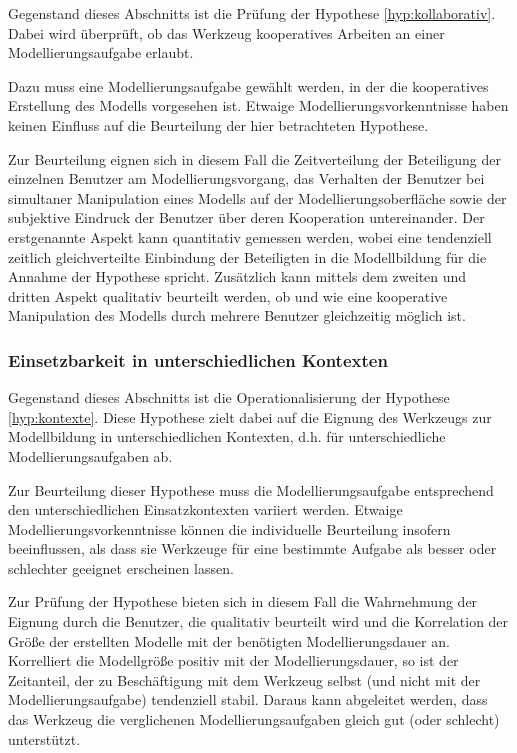 Gegenstand dieses Abschnitts ist die Prüfung der Hypothese \ref{hyp:kollaborativ}. Dabei wird überprüft, ob das Werkzeug kooperatives Arbeiten an einer Modellierungsaufgabe erlaubt.

Dazu muss eine Modellierungsaufgabe gewählt werden, in der die kooperatives Erstellung des Modells vorgesehen ist. Etwaige Modellierungsvorkenntnisse haben keinen Einfluss auf die Beurteilung der hier betrachteten Hypothese.

Zur Beurteilung eignen sich in diesem Fall die Zeitverteilung der Beteiligung der einzelnen Benutzer am Modellierungsvorgang, das Verhalten der Benutzer bei simultaner Manipulation eines Modells auf der Modellierungsoberfläche sowie der subjektive Eindruck der Benutzer über deren Kooperation untereinander. Der erstgenannte Aspekt kann quantitativ gemessen werden, wobei eine tendenziell zeitlich gleichverteilte Einbindung der Beteiligten in die Modellbildung für die Annahme der Hypothese spricht. Zusätzlich kann mittels dem zweiten und dritten Aspekt qualitativ beurteilt werden, ob und wie eine kooperative Manipulation des Modells durch mehrere Benutzer gleichzeitig möglich ist.


\subsubsection{Einsetzbarkeit in unterschiedlichen Kontexten} %
\label{ssub:einsetzbarkeit_in_unterschiedlichen_kontexten}

Gegenstand dieses Abschnitts ist die Operationalisierung der Hypothese \ref{hyp:kontexte}. Diese Hypothese zielt dabei auf die Eignung des Werkzeugs zur Modellbildung in unterschiedlichen Kontexten, d.h. für unterschiedliche Modellierungsaufgaben ab. 

Zur Beurteilung dieser Hypothese muss die Modellierungsaufgabe entsprechend den unterschiedlichen Einsatzkontexten variiert werden. Etwaige Modellierungsvorkenntnisse können die individuelle Beurteilung insofern beeinflussen, als dass sie Werkzeuge für eine bestimmte Aufgabe als besser oder schlechter geeignet erscheinen lassen.

Zur Prüfung der Hypothese bieten sich in diesem Fall die Wahrnehmung der Eignung durch die Benutzer, die qualitativ beurteilt wird und die Korrelation der Größe der erstellten Modelle mit der benötigten Modellierungsdauer an. Korrelliert die Modellgröße positiv mit der Modellierungsdauer, so ist der Zeitanteil, der zu Beschäftigung mit dem Werkzeug selbst (und nicht mit der Modellierungsaufgabe) tendenziell stabil. Daraus kann abgeleitet werden, dass das Werkzeug die verglichenen Modellierungsaufgaben gleich gut (oder schlecht) unterstützt.

